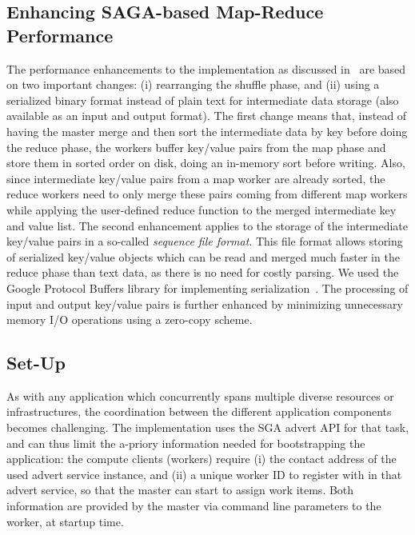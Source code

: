 \documentclass[3p,twocolumn]{elsarticle}
\begin{document}
\subsection{Enhancing SAGA-based Map-Reduce Performance}


The performance enhancements to the \sagamapreduce implementation as
discussed in~\cite{saga_ccgrid09} are based on two important changes:
(i) rearranging the shuffle phase, and (ii) using a serialized binary
format instead of plain text for intermediate data storage (also
available as an input and output format).  The first change means
that, instead of having the master merge and then sort the
intermediate data by key before doing the reduce phase, the workers
buffer key/value pairs from the map phase and store them in sorted
order on disk, doing an in-memory sort before writing. Also, since
intermediate key/value pairs from a map worker are already sorted, the
reduce workers need to only merge these pairs coming from different
map workers while applying the user-defined reduce function to the
merged intermediate key and value list.  The second enhancement
applies to the storage of the intermediate key/value pairs in a
so-called \emph{sequence file format}. This file format allows storing
of serialized key/value objects which can be read and merged much
faster in the reduce phase than text data, as there is no need for
costly parsing.  We used the Google Protocol Buffers library for
implementing serialization~\cite{protobuf}.  The processing of input
and output key/value pairs is further enhanced by minimizing
unnecessary memory I/O operations using a zero-copy scheme.


\subsection{\sagamapreduce Set-Up}

As with any application which concurrently spans multiple diverse
resources or infrastructures, the coordination between the different
application components becomes challenging.  The \smr implementation
uses the SGA advert API for that task, and can thus limit the a-priory
information needed for bootstrapping the application: the compute
clients (workers) require (i) the contact address of the used advert
service instance, and (ii) a unique worker ID to register with in that
advert service, so that the master can start to assign work items.
Both information are provided by the master via command line
parameters to the worker, at startup time.
\end{document}
